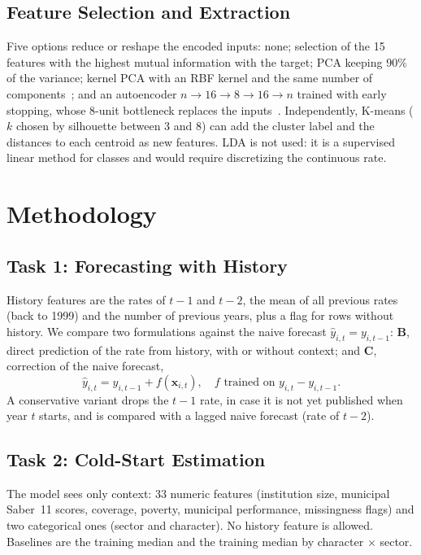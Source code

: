 \documentclass[conference]{IEEEtran}
\begin{document}
\subsection{Feature Selection and Extraction}
Five options reduce or reshape the encoded inputs: none; selection of the 15 features with the highest mutual information with the target; PCA keeping 90\% of the variance; kernel PCA with an RBF kernel and the same number of components~\cite{scholkopf1998}; and an autoencoder $n\to16\to8\to16\to n$ trained with early stopping, whose 8-unit bottleneck replaces the inputs~\cite{hinton2006}. Independently, K-means ($k$ chosen by silhouette between 3 and 8) can add the cluster label and the distances to each centroid as new features. LDA is not used: it is a supervised linear method for classes and would require discretizing the continuous rate.

\section{Methodology}

\subsection{Task 1: Forecasting with History}
History features are the rates of $t-1$ and $t-2$, the mean of all previous rates (back to 1999) and the number of previous years, plus a flag for rows without history. We compare two formulations against the naive forecast $\hat y_{i,t}=y_{i,t-1}$: \textbf{B}, direct prediction of the rate from history, with or without context; and \textbf{C}, correction of the naive forecast,
\begin{equation}
\hat{y}_{i,t} = y_{i,t-1} + f(\mathbf{x}_{i,t}), \quad f \text{ trained on } y_{i,t}-y_{i,t-1}.
\end{equation}
A conservative variant drops the $t-1$ rate, in case it is not yet published when year $t$ starts, and is compared with a lagged naive forecast (rate of $t-2$).

\subsection{Task 2: Cold-Start Estimation}
The model sees only context: 33 numeric features (institution size, municipal Saber~11 scores, coverage, poverty, municipal performance, missingness flags) and two categorical ones (sector and character). No history feature is allowed. Baselines are the training median and the training median by character $\times$ sector.
\end{document}
